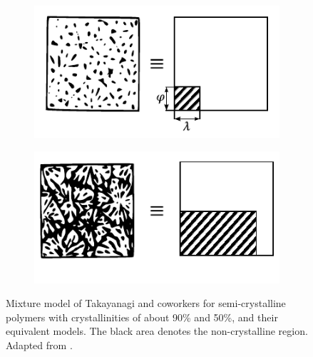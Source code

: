 \begin{figure}[hbtp]
\centering
\begin{subfigure}[b]{0.45\textwidth}
\centering
\includegraphics[width=\textwidth]{figures/takaynagi_low}
\caption{}
\label{subfig:takaynagi_low}
\end{subfigure} \hfill
	\begin{subfigure}[b]{0.45\textwidth}
		\centering
						\includegraphics[width=\textwidth]{figures/takaynagi_high}
						\caption{}
						\label{subfig:takaynagi_high}
		\end{subfigure}
	\caption{Mixture model of Takayanagi and coworkers \citep{takayanagiApplicationEquivalentModel1964} for semi-crystalline polymers with crystallinities of about  90\% and  50\%, and their equivalent models. The black area denotes the non-crystalline region. Adapted from \cite{takayanagiApplicationEquivalentModel1964}. }
\label{fig:model_takayanagi}
\end{figure}

